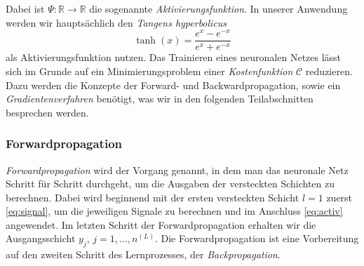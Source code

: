 Dabei ist $\Psi: \mathbb{R} \rightarrow \mathbb{R}$ die sogenannte \textit{Aktivierungsfunktion}. In unserer Anwendung
werden wir hauptsächlich den \textit{Tangens hyperbolicus}
\[
    \tanh(x)=\frac{e^x - e^{-x}}{e^x + e^{-x}}
\]
als Aktivierungsfunktion nutzen. Das Trainieren eines neuronalen Netzes lässt sich im Grunde auf ein Minimierungsproblem
einer \textit{Kostenfunktion} $\mathcal{C}$
reduzieren. Dazu werden die Konzepte der Forward- und Backwardpropagation, sowie ein \textit{Gradientenverfahren}
benötigt, was wir in den folgenden Teilabschnitten besprechen werden.

\subsubsection{Forwardpropagation}
{\em Forwardpropagation} wird der Vorgang genannt, in dem man das neuronale Netz Schritt für Schritt durchgeht, um die
Ausgaben der versteckten Schichten zu berechnen. Dabei wird beginnend mit der ersten versteckten Schicht  $l = 1$
zuerst \eqref{eq:signal}, um die jeweiligen Signale zu berechnen und im Anschluss \eqref{eq:activ} angewendet.
Im letzten Schritt der Forwardpropagation erhalten wir die Ausgangsschicht $y_{j}$, $j = 1 ,\dots, n^{(L)}$.
Die Forwardpropagation ist eine Vorbereitung auf den zweiten Schritt des Lernprozesses, der \textit{Backpropagation}.

